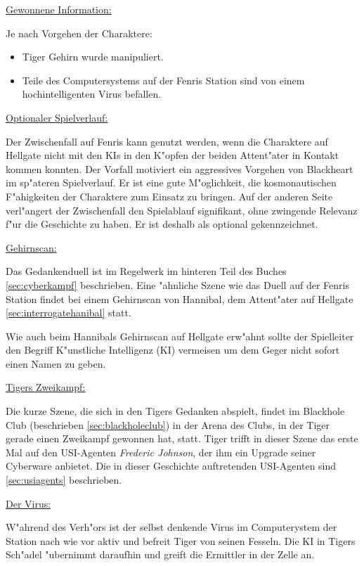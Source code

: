 \begin{remarks}
	\underline{Gewonnene Information:}

	Je nach Vorgehen der Charaktere:
	
	\begin{itemize}
		\item Tiger Gehirn wurde manipuliert.
		\item Teile des Computersystems auf der Fenris Station sind von einem hochintelligenten Virus befallen.
	\end{itemize}

	\underline{Optionaler Spielverlauf:}

	Der Zwischenfall auf Fenris kann genutzt werden, wenn die Charaktere auf Hellgate nicht mit den KIs in den K"opfen der beiden Attent"ater in Kontakt kommen konnten. Der Vorfall motiviert ein aggressives Vorgehen von Blackheart im sp"ateren Spielverlauf. Er ist eine gute M"oglichkeit, die kosmonautischen F"ahigkeiten der Charaktere zum Einsatz zu bringen. Auf der anderen Seite verl"angert der Zwischenfall den Spielablauf signifikant, ohne zwingende Relevanz f"ur die Geschichte zu haben. Er ist deshalb als optional gekennzeichnet.

	\underline{Gehirnscan:}

	Das Gedankenduell ist im Regelwerk im hinteren Teil des Buches \cref{sec:cyberkampf} beschrieben. Eine "ahnliche Szene wie das Duell auf der Fenris Station findet bei einem Gehirnscan von Hannibal, dem Attent"ater auf Hellgate \cref{sec:interrogatehanibal} statt.

	Wie auch beim Hannibals Gehirnscan auf Hellgate erw"ahnt sollte der Spielleiter den Begriff K"unstliche Intelligenz (KI) vermeisen um dem Geger nicht sofort einen Namen zu geben.

	\underline{Tigers Zweikampf:}

	Die kurze Szene, die sich in den Tigers Gedanken abspielt, findet im Blackhole Club (beschrieben \cref{sec:blackholeclub}) in der Arena des Clubs, in der Tiger gerade einen Zweikampf gewonnen hat, statt. Tiger trifft in dieser Szene das erste Mal auf den USI-Agenten \emph{Frederic Johnson}, der ihm ein Upgrade seiner Cyberware anbietet. Die in dieser Geschichte auftretenden USI-Agenten sind \cref{sec:usiagents} beschrieben.

	\underline{Der Virus:}

	W"ahrend des Verh"ors ist der selbst denkende Virus im Computerystem der Station nach wie vor aktiv und befreit Tiger von seinen Fesseln. Die KI in Tigers Sch"adel "ubernimmt daraufhin und greift die Ermittler in der Zelle an.

\end{remarks}
